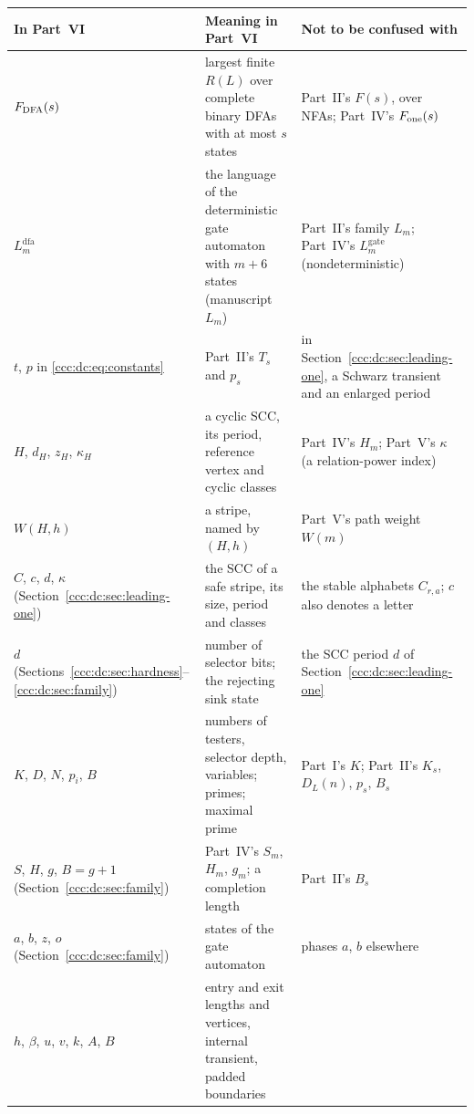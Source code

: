 \documentclass[11pt,letterpaper]{article}
\theoremstyle{definition}
\theoremstyle{remark}
\newcommand{\Lgate}[1]{L^{\mathrm{gate}}_{#1}}
\newcommand{\Ldfa}[1]{L^{\mathrm{dfa}}_{#1}}
\begin{document}
\begin{center}\small
\begin{tabular}{@{}>{\raggedright\arraybackslash}p{}>{\raggedright\arraybackslash}p{}>{\raggedright\arraybackslash}p{}@{}}
\toprule
\textbf{In Part~VI} & \textbf{Meaning in Part~VI} & \textbf{Not to be confused with}\\
\midrule
$F_{\rm DFA}(s)$ & largest finite $R(L)$ over complete binary DFAs with at most $s$ states & Part~II's $F(s)$, over NFAs; Part~IV's $F_{\rm one}(s)$\\[3pt]
$\Ldfa m$ & the language of the deterministic gate automaton with $m+6$ states (manuscript $L_m$) & Part~II's family $L_m$; Part~IV's $\Lgate m$ (nondeterministic)\\[3pt]
$t$, $p$ in \eqref{ccc:dc:eq:constants} & Part~II's $T_s$ and $p_s$ & in Section~\ref{ccc:dc:sec:leading-one}, a Schwarz transient and an enlarged period\\[3pt]
$H$, $d_H$, $z_H$, $\kappa_H$ & a cyclic SCC, its period, reference vertex and cyclic classes & Part~IV's $H_m$; Part~V's $\kappa$ (a relation-power index)\\[3pt]
$W(H,h)$ & a stripe, named by $(H,h)$ & Part~V's path weight $W(m)$\\[3pt]
$C$, $c$, $d$, $\kappa$ (Section~\ref{ccc:dc:sec:leading-one}) & the SCC of a safe stripe, its size, period and classes & the stable alphabets $C_{r,a}$; $c$ also denotes a letter\\[3pt]
$d$ (Sections~\ref{ccc:dc:sec:hardness}--\ref{ccc:dc:sec:family}) & number of selector bits; the rejecting sink state & the SCC period $d$ of Section~\ref{ccc:dc:sec:leading-one}\\[3pt]
$K$, $D$, $N$, $p_i$, $B$ & numbers of testers, selector depth, variables; primes; maximal prime & Part~I's $K$; Part~II's $K_s$, $D_L(n)$, $p_s$, $B_s$\\[3pt]
$S$, $H$, $g$, $B=g+1$ (Section~\ref{ccc:dc:sec:family}) & Part~IV's $S_m$, $H_m$, $g_m$; a completion length & Part~II's $B_s$\\[3pt]
$a$, $b$, $z$, $o$ (Section~\ref{ccc:dc:sec:family}) & states of the gate automaton & phases $a$, $b$ elsewhere\\[3pt]
$h$, $\beta$, $u$, $v$, $k$, $A$, $B$ & entry and exit lengths and vertices, internal transient, padded boundaries & \\
\bottomrule
\end{tabular}
\end{center}
\end{document}
